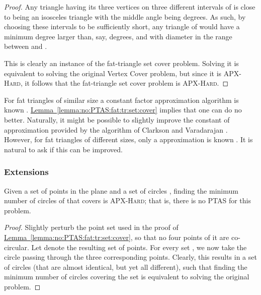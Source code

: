 \documentclass[12pt]{article}
\newcommand{\Term}[1]{\textsf{#1}}
\theoremstyle{remark}\theoremheaderfont{\sf}\theorembodyfont{\upshape}
\numberwithin{figure}{section}\numberwithin{table}{section}\numberwithin{equation}{section}
\newcommand{\HLink}[2]{\hyperref[#2]{#1~\ref*{#2}}}
\newcommand{\lemlab}[1]{\label{lemma:#1}}
\newcommand{\lemref}[1]{\HLink{Lemma}{lemma:#1}}
\newcommand{\ProblemC}[1]{\textsf{#1}}
\providecommand{\ComplexityClass}[1]{{{\textcolor[named]{ColorComplexityClass}{\textsc{#1}}}}}
\newcommand{\PTAS}{\Term{PTAS}\xspace}
\newcommand{\APXHard}{\ComplexityClass{APX-Hard}\xspace}
\begin{document}
\begin{proof}
  Any triangle having its three vertices on three different intervals
  of  is close to being an isosceles triangle with
  the middle angle being  degrees. As such, by choosing these
  intervals to be sufficiently short, any triangle of  would
  have a minimum degree larger than, say,  degrees, and
  with diameter in the range between  and .

  This is clearly an instance of the fat-triangle set cover
  problem. Solving it is equivalent to solving the original
  \ProblemC{Vertex Cover} problem, but since it is \APXHard, it
  follows that the fat-triangle set cover problem is \APXHard.
\end{proof}

\begin{remark}
  For fat triangles of similar size a constant factor approximation
  algorithm is known \cite{cv-iaags-07}.
  \lemref{no:PTAS:fat:tr:set:cover} implies that one can do no
  better. Naturally, it might be possible to slightly improve the
  constant of approximation provided by the algorithm of Clarkson and
  Varadarajan \cite{cv-iaags-07}.
However, for fat triangles of different sizes, only a 
  approximation is known \cite{abes-ibulf-14}. It is natural to ask if
  this can be improved.
\end{remark}

\subsubsection{Extensions}

\begin{lemma}
  \lemlab{no:P:T:A:S:circles}Given a set of points  in the plane and a set of circles
  , finding the minimum number of circles of  that
  covers  is \APXHard; that is, there is no \PTAS for this
  problem.
\end{lemma}
\begin{proof}
  Slightly perturb the point set used in the proof of
  \lemref{no:PTAS:fat:tr:set:cover}, so that no four points of it are
  co-circular. Let  denote the resulting set of points. For
  every set , we now take the circle
  passing through the three corresponding points. Clearly, this
  results in a set of circles (that are almost identical, but yet all
  different), such that finding the minimum number of circles covering
  the set  is equivalent to solving the original problem.
\end{proof}
\end{document}
